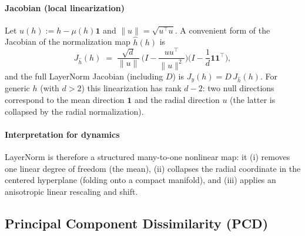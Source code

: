 \documentclass[a4paper,12pt]{article}
\begin{document}
\paragraph{Jacobian (local linearization)}
Let \(u(h):=h-\mu(h)\mathbf1\) and \(\|u\|=\sqrt{u^\top u}\).  A convenient form of the Jacobian of the normalization map \(\widehat{h}(h)\) is
\[
J_{\widehat{h}}(h)
\;=\;
\frac{\sqrt{d}}{\|u\|}\,\Big(I - \frac{u u^\top}{\|u\|^2}\Big)\Big(I - \frac{1}{d}\mathbf1\mathbf1^\top\Big),
\]
and the full LayerNorm Jacobian (including \(D\)) is \(J_y(h)=D\,J_{\widehat{h}}(h)\).  For generic \(h\) (with \(d>2\)) this linearization has rank \(d-2\): two null directions correspond to the mean direction \(\mathbf1\) and the radial direction \(u\) (the latter is collapsed by the radial normalization).

\paragraph{Interpretation for dynamics} %
LayerNorm is therefore a structured many-to-one nonlinear map: it (i) removes one linear degree of freedom (the mean), (ii) collapses the radial coordinate in the centered hyperplane (folding onto a compact manifold), and (iii) applies an anisotropic linear rescaling and shift.

\subsection{Principal Component Dissimilarity (PCD)}
\label{subsec:pca_distance} 
\end{document}
